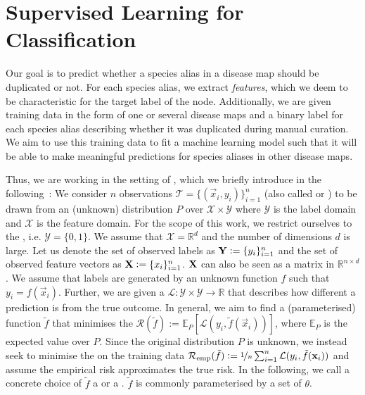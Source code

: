 \documentclass[
	fontsize=10pt, %
	twoside=true, %
	secnumdepth=1, %
  toc=indentunnumbered %
]{kaobook}
\begin{document}
\section{Supervised Learning for Classification}%
\label{sec:supervised-learning}
Our goal is to predict whether a species alias in a disease map
should be duplicated or not. For each species alias, we extract 
\textit{features}, which we deem to be characteristic for the target label of
the node.
Additionally, we are given training
data in the form of one or several disease maps and a binary label for each
species alias describing whether it was duplicated during manual curation. We
aim to use this training data to fit a machine learning model such that it will
be able to make meaningful predictions for species aliases in other disease
maps.

Thus, we are working in the setting of , which we
briefly introduce in the
following~\cite{vapnik_PrinciplesRiskMinimization_,bronstein_geometric_2021}:
We consider $n$ observations $\mathcal{T} = \{(\vec x_i, y_i)\}_{i=1}^n$ (also
called  or ) to be drawn from an (unknown)
distribution $P$ over $\mathcal{X} \times \mathcal{Y}$ where $\mathcal{Y}$ is
the label domain and $\mathcal{X}$ is the feature domain. For the scope of this
work, we restrict ourselves to the , i.e.
$\mathcal{Y} = \{0,1\}$. We assume that $\mathcal{X} = \mathbb{R}^d$ and the
number of dimensions $d$ is large. Let us denote the set of
observed  labels as $\mat Y := \{y_i\}_{i=1}^n$ and the set of
observed feature vectors as $\mat X := \{x_i\}_{i=1}^n$. $\mat X$ can also be
seen as a matrix in $\mathbb{R}^{n \times d}$.
%
We assume that labels are generated by an unknown function $f$ such that $y_i
= f(\vec x_i)$.
%
Further, we are given a  $\mathcal{L} :
\mathcal{Y} \times \mathcal{Y} \rightarrow \mathbb{R}$ that describes how
different a prediction is from the true outcome.
%
In general, we aim to find a (parameterised) function $\tilde f$ that minimises
the  $\mathcal{R}(\tilde f) := \mathbb{E}_P\left[ \mathcal{L}(y_i,
    \tilde f(\vec x_i)) \right]$, where $\mathbb{E}_P$ is the expected value
over $P$.
%
Since the original distribution $P$ is unknown, we instead seek to minimise the 
  on the training data
$\mathcal{R}_{\text{emp}}(\tilde f) := \nicefrac{1}{n}
\sum_{i=1}^n \mathcal{L}(y_i, \tilde f(\vec x_i))$ and assume the empirical risk
approximates the true risk.
%
In the following, we call a concrete choice of $\tilde f$ a  or a
. $\tilde f$ is commonly parameterised by a set of 
$\theta$.
\end{document}
